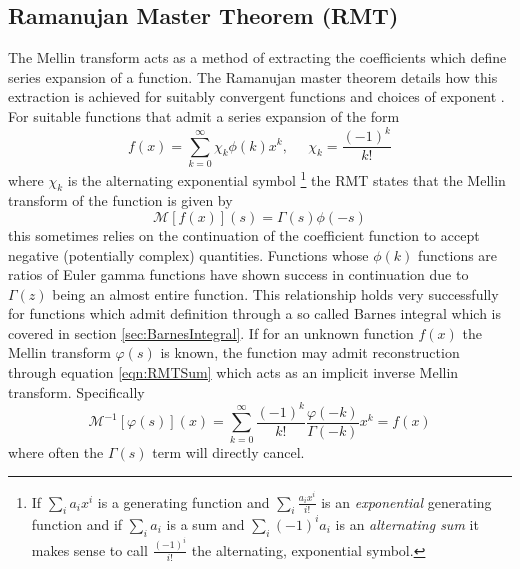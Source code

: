 \documentclass[journal=jcisd8,manuscript=article,layout=onecolumn,pdftex,floatfix,amsmath,amssymb,10pt]{achemso}
\begin{document}
\subsection{Ramanujan Master Theorem (RMT)}
The Mellin transform acts as a method of extracting the coefficients which define series expansion of a function. The Ramanujan master theorem details how this extraction is achieved for suitably convergent functions and choices of exponent \cite{}. For suitable functions that admit a series expansion of the form
\begin{equation}
f(x) = \sum_{k=0}^\infty \chi_k \phi(k)x^k, \;\;\;\;\; \chi_k = \frac{(-1)^k}{k!}
\label{eqn:RMTSum}
\end{equation}
where $\chi_k$ is the alternating exponential symbol \footnote{If $\sum_i a_ix^i$ is a generating function and $\sum_i \frac{a_ix^i}{i!}$ is an \emph{exponential} generating function and if $\sum_{i} a_i$ is a sum and $\sum_i (-1)^i a_i$ is an \emph{alternating sum} it makes sense to call $\frac{(-1)^i}{i!}$ the alternating, exponential symbol.} the RMT states that the Mellin transform of the function is given by
\begin{equation}
\mathcal{M}[f(x)](s) = \Gamma(s)\phi(-s)
\end{equation}
this sometimes relies on the continuation of the coefficient function to accept negative (potentially complex) quantities. Functions whose $\phi(k)$ functions are ratios of Euler gamma functions have shown success in continuation due to $\Gamma(z)$ being an almost entire function. This relationship holds very successfully for functions which admit definition through a so called Barnes integral which is covered in section \ref{sec:BarnesIntegral}. If for an unknown function $f(x)$ the Mellin transform $\varphi(s)$ is known, the function may admit reconstruction through equation \ref{eqn:RMTSum} which acts as an implicit inverse Mellin transform. Specifically
\begin{equation}
\mathcal{M}^{-1}[\varphi(s)](x) = \sum_{k=0}^\infty \frac{(-1)^k}{k!}\frac{\varphi(-k)}{\Gamma(-k)}x^k = f(x)
\label{eqn:ImplicitInverseMellin}
\end{equation}
where often the $\Gamma(s)$ term will directly cancel. 
\end{document}
